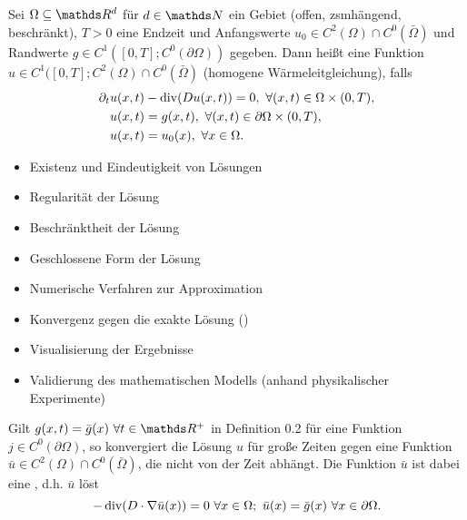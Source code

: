 Sei $\Omega \subseteq \R^d$ für $d\in \N$ ein Gebiet (offen, zsmhängend, beschränkt), $T>0$ eine Endzeit und Anfangswerte $u_0\in C^2(\Omega)\cap C^0(\bar{\Omega})$ und Randwerte $g\in C^1([0,T]; C^0(\partial\Omega))$ gegeben.
Dann heißt eine Funktion $u\in C^1([0,T]; C^2(\Omega)\cap C^0(\bar{\Omega})$  (homogene Wärmeleitgleichung), falls
\begin{align*}
\partial_t u(x,t) &- \operatorname{div}(D u(x,t)) = 0,~\forall (x,t)\in \Omega\times (0,T),\\
u(x,t) &= g(x,t),~\forall (x,t)\in \partial \Omega\times (0,T),\\
u(x,t) &= u_0(x), ~\forall x\in \Omega.
\end{align*}

\begin{itemize}
	\item Existenz und Eindeutigkeit von Lösungen
	\item Regularität der Lösung
	\item Beschränktheit der Lösung
	\item Geschlossene Form der Lösung
	\item Numerische Verfahren zur Approximation
	\item Konvergenz gegen die exakte Lösung ()
	\item Visualisierung der Ergebnisse
	\item Validierung des mathematischen Modells (anhand physikalischer Experimente)
\end{itemize}

Gilt $g(x,t) = \bar{g}(x)~\forall t\in \R^+$ in Definition 0.2 für eine Funktion $j\in C^0(\partial \Omega)$, so konvergiert die Lösung $u$ für große Zeiten gegen eine Funktion $\bar{u}\in C^2(\Omega) \cap C^0(\bar{\Omega})$, die nicht von der Zeit abhängt.
Die Funktion $\bar{u}$ ist dabei eine , d.h. $\bar{u}$ löst
\[
-\operatorname{div}(D\cdot \nabla \bar{u}(x)) = 0~\forall x\in \Omega;~ \bar{u}(x) = \bar{g}(x) ~\forall x\in \partial \Omega.
\]


